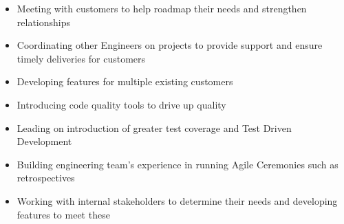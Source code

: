 \documentclass[10pt,a4paper,ragged2e]{altacv}
\begin{document}

\begin{fullwidth}
\makecvheader
\end{fullwidth}



\begin{itemize}
\item Meeting with customers to help roadmap their needs and strengthen relationships
\item Coordinating other Engineers on projects to provide support and ensure timely deliveries for customers
\item Developing features for multiple existing customers
\end{itemize}

\divider

\begin{itemize}
\item Introducing code quality tools to drive up quality
\item Leading on introduction of greater test coverage and Test Driven Development
\item Building engineering team's experience in running Agile Ceremonies such as retrospectives
\item Working with internal stakeholders to determine their needs and developing features to meet these
\end{itemize}
\end{document}
